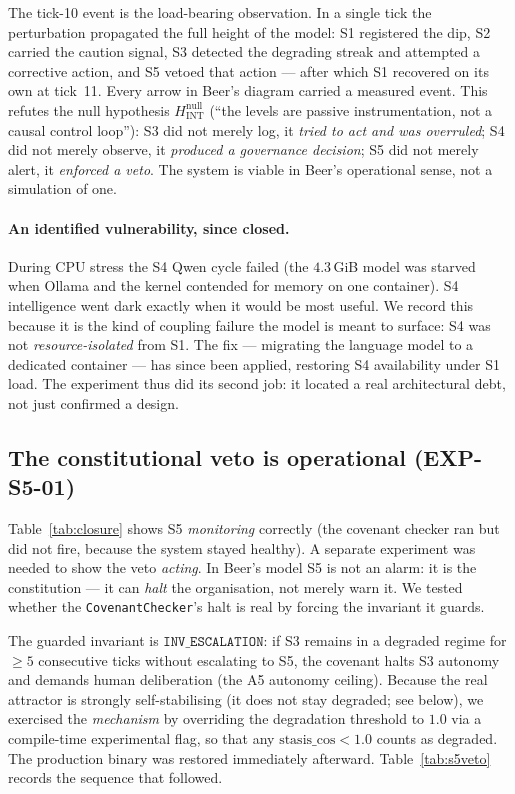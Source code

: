 \documentclass[11pt, a4paper]{article}
\begin{document}
The tick-10 event is the load-bearing observation. In a single tick the perturbation
propagated the full height of the model: S1 registered the dip, S2 carried the
caution signal, S3 detected the degrading streak and attempted a corrective action,
and S5 vetoed that action --- after which S1 recovered on its own at tick~11. Every
arrow in Beer's diagram carried a measured event. This refutes the null hypothesis
$H^{\text{null}}_{\text{INT}}$ (``the levels are passive instrumentation, not a
causal control loop''): S3 did not merely log, it \emph{tried to act and was
overruled}; S4 did not merely observe, it \emph{produced a governance decision}; S5
did not merely alert, it \emph{enforced a veto}. The system is viable in Beer's
operational sense, not a simulation of one.

\paragraph{An identified vulnerability, since closed.} During CPU stress the S4 Qwen
cycle failed (the $4.3$\,GiB model was starved when Ollama and the kernel contended
for memory on one container). S4 intelligence went dark exactly when it would be most
useful. We record this because it is the kind of coupling failure the model is meant
to surface: S4 was not \emph{resource-isolated} from S1. The fix --- migrating the
language model to a dedicated container --- has since been applied, restoring S4
availability under S1 load. The experiment thus did its second job: it located a real
architectural debt, not just confirmed a design.

\subsection{The constitutional veto is operational (EXP-S5-01)}
\label{sec:s5veto}

Table~\ref{tab:closure} shows S5 \emph{monitoring} correctly (the covenant checker
ran but did not fire, because the system stayed healthy). A separate experiment was
needed to show the veto \emph{acting}. In Beer's model S5 is not an alarm: it is the
constitution --- it can \emph{halt} the organisation, not merely warn it. We tested
whether the \texttt{CovenantChecker}'s halt is real by forcing the invariant it
guards.

The guarded invariant is $\texttt{INV\_ESCALATION}$: if S3 remains in a degraded
regime for $\ge 5$ consecutive ticks without escalating to S5, the covenant halts S3
autonomy and demands human deliberation (the A5 autonomy ceiling). Because the real
attractor is strongly self-stabilising (it does not stay degraded; see below), we
exercised the \emph{mechanism} by overriding the degradation threshold to $1.0$ via a
compile-time experimental flag, so that any $\text{stasis\_cos} < 1.0$ counts as
degraded. The production binary was restored immediately afterward.
Table~\ref{tab:s5veto} records the sequence that followed.
\end{document}
